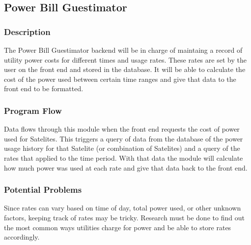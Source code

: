 
\subsection{Power Bill Guestimator}

\subsubsection{Description}

The Power Bill Guestimator backend will be in charge of maintaing a record of utility power costs for different times and usage rates.
These rates are set by the user on the front end and stored in the database.
It will be able to calculate the cost of the power used between certain time ranges and give that data to the front end to be formatted.

\subsubsection{Program Flow}

Data flows through this module when the front end requests the cost of power used for Satelites. 
This triggers a query of data from the database of the power usage history for that Satelite (or combination of Satelites) and a query of the rates that applied to the time period.
With that data the module will calculate how much power was used at each rate and give that data back to the front end.


\subsubsection{Potential Problems}

Since rates can vary based on time of day, total power used, or other unknown factors, keeping track of rates may be tricky. Research must be done to find out the most common ways utilities charge for power and be able to store rates accordingly.
